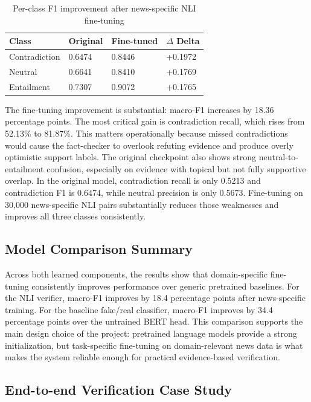 \documentclass[11pt]{article}
\begin{document}
\begin{table}[htbp]
    \centering
    \caption{Per-class F1 improvement after news-specific NLI fine-tuning}
    \begin{tabularx}{0.88\textwidth}{@{}lYYY@{}}
        \toprule
        \textbf{Class} & \textbf{Original} & \textbf{Fine-tuned} & \textbf{$\Delta$ Delta} \\
        \midrule
        Contradiction & 0.6474 & 0.8446 & +0.1972 \\
        Neutral & 0.6641 & 0.8410 & +0.1769 \\
        Entailment & 0.7307 & 0.9072 & +0.1765 \\
        \bottomrule
    \end{tabularx}
\end{table}

The fine-tuning improvement is substantial: macro-F1 increases by 18.36
percentage points. The most critical gain is contradiction recall, which rises
from 52.13\% to 81.87\%. This matters operationally because missed
contradictions would cause the fact-checker to overlook refuting evidence and
produce overly optimistic support labels. The original checkpoint also shows
strong neutral-to-entailment confusion, especially on evidence with topical but
not fully supportive overlap. In the original model, contradiction recall is
only 0.5213 and contradiction F1 is 0.6474, while neutral precision is only
0.5673. Fine-tuning on 30,000 news-specific NLI pairs substantially reduces
those weaknesses and improves all three classes consistently.

\subsection{Model Comparison Summary}

Across both learned components, the results show that domain-specific
fine-tuning consistently improves performance over generic pretrained baselines.
For the NLI verifier, macro-F1 improves by 18.4 percentage points after
news-specific training. For the baseline fake/real classifier, macro-F1 improves
by 34.4 percentage points over the untrained BERT head. This comparison
supports the main design choice of the project: pretrained language models
provide a strong initialization, but task-specific fine-tuning on
domain-relevant news data is what makes the system reliable enough for practical
evidence-based verification.

\subsection{End-to-end Verification Case Study}
\end{document}

